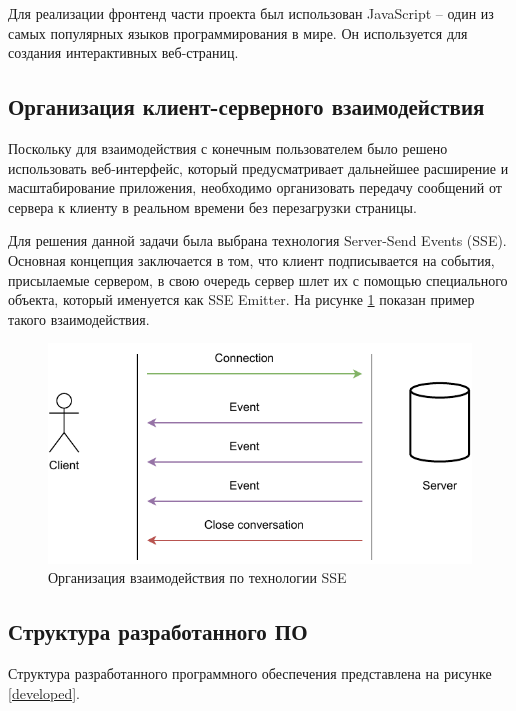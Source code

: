 Для реализации фронтенд части проекта был использован JavaScript – один из самых популярных языков программирования в мире. Он используется для создания интерактивных веб-страниц.

\subsection{Организация клиент-серверного взаимодействия}

Поскольку для взаимодействия с конечным пользователем было решено использовать веб-интерфейс, который предусматривает дальнейшее расширение и масштабирование приложения, необходимо организовать передачу сообщений от сервера к клиенту в реальном времени без перезагрузки страницы. 

Для решения данной задачи была выбрана технология Server-Send Events (SSE)\cite{sse}. Основная концепция заключается в том, что клиент подписывается на события, присылаемые сервером, в свою очередь сервер шлет их с помощью специального объекта, который именуется как SSE Emitter. На рисунке \ref{sse} показан пример такого взаимодействия.

\begin{figure}[hbtp]
	\centering
	\includegraphics[scale=1.1]{img/sse.drawio.pdf}
	\caption{Организация взаимодействия по технологии SSE}
	\label{sse}
\end{figure}

\subsection{Структура разработанного ПО}

Структура разработанного программного обеспечения представлена на рисунке \ref{developed}.

